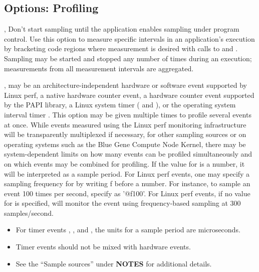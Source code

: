 \documentclass[english]{article}
\begin{document}
\subsection{Options: Profiling}

\begin{Description}

\item[\Opt{-ds}, \Opt{--delay-sampling}]
Don't start sampling until the application enables sampling under program control. 
Use this option to measure specific intervals in an application's execution by bracketing code 
regions where measurement is desired 
with calls to  and .
Sampling may be started and stopped any number of times during an execution;
measurements from all measurement intervals are aggregated.

\item[\OptArg{-e}{event\Lbr@howoften\Rbr}, \OptArg{--event}{event\Lbr@howoften\Rbr}]
 may be an architecture-independent hardware or software event supported by Linux perf, a native hardware counter event, 
a hardware counter event supported by the PAPI library, a Linux system timer ( and ), or the
operating system interval timer .
This option may be given multiple times to profile several events at once. 
While events measured using the Linux perf monitoring infrastructure will be transparently multiplexed if necessary, 
for other sampling sources or on operating systems such as the Blue Gene Compute Node Kernel,
there may be system-dependent limits on how many events can be profiled simultaneously and on which events may be combined for profiling.
If the value for  is a number, it will be interpreted as a sample period.
For Linux perf events, one may specify a sampling frequency for  by writing f before a number.  
For instance, to sample an event 100 times per second, specify  as '@f100'.
For Linux perf events, if no value for  is specified,  will monitor the event using frequency-based sampling at 300 samples/second.
\begin{itemize}
  \item For timer events , , and , the units for a sample period are microseconds.
  \item Timer events should not be mixed with hardware events.
  \item See the ``Sample sources'' under \textbf{NOTES} for additional details.
\end{itemize}


\end{Description}
\end{document}

